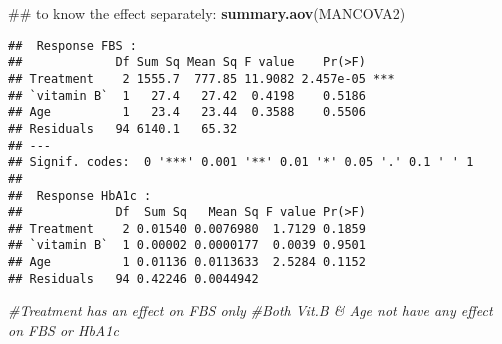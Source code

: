 \documentclass[]{article}
\newenvironment{Shaded}{\begin{snugshade}}{\end{snugshade}}
\newcommand{\KeywordTok}[1]{\textcolor[rgb]{0.13,0.29,0.53}{\textbf{#1}}}
\newcommand{\CommentTok}[1]{\textcolor[rgb]{0.56,0.35,0.01}{\textit{#1}}}
\newcommand{\NormalTok}[1]{#1}
\begin{document}
\begin{Shaded}
\begin{Highlighting}[]
\NormalTok{## to know the effect separately:}
\KeywordTok{summary.aov}\NormalTok{(MANCOVA2)}
\end{Highlighting}
\end{Shaded}

\begin{verbatim}
##  Response FBS :
##             Df Sum Sq Mean Sq F value    Pr(>F)    
## Treatment    2 1555.7  777.85 11.9082 2.457e-05 ***
## `vitamin B`  1   27.4   27.42  0.4198    0.5186    
## Age          1   23.4   23.44  0.3588    0.5506    
## Residuals   94 6140.1   65.32                      
## ---
## Signif. codes:  0 '***' 0.001 '**' 0.01 '*' 0.05 '.' 0.1 ' ' 1
## 
##  Response HbA1c :
##             Df  Sum Sq   Mean Sq F value Pr(>F)
## Treatment    2 0.01540 0.0076980  1.7129 0.1859
## `vitamin B`  1 0.00002 0.0000177  0.0039 0.9501
## Age          1 0.01136 0.0113633  2.5284 0.1152
## Residuals   94 0.42246 0.0044942
\end{verbatim}

\begin{Shaded}
\begin{Highlighting}[]
\CommentTok{#Treatment has an effect on FBS only  }
\CommentTok{#Both Vit.B & Age  not have any effect on FBS or HbA1c}
\end{Highlighting}
\end{Shaded}
\end{document}
